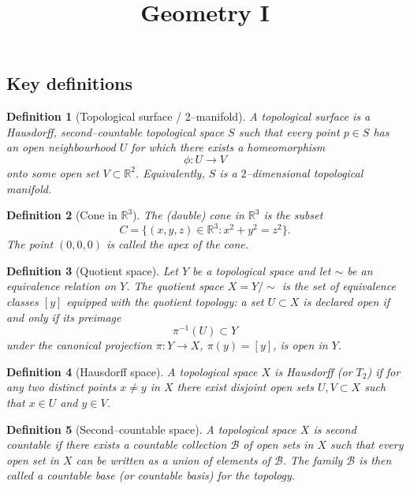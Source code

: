 \documentclass[12pt,a4paper]{article}
\title{Geometry I}
\author{}
\date{}
\theoremstyle{plain}
\newtheorem{definition}{Definition}
\theoremstyle{definition}      %
\begin{document}
	\maketitle
	

\subsection*{Key definitions}

\begin{definition}[Topological surface / 2--manifold]
	A \emph{topological surface} is a Hausdorff, second--countable topological
	space $S$ such that every point $p\in S$ has an open neighbourhood $U$
	for which there exists a homeomorphism
	\[
	\phi:U \longrightarrow V
	\]
	onto some open set $V\subset\mathbb{R}^2$.
	Equivalently, $S$ is a $2$--dimensional topological manifold.
\end{definition}

\begin{definition}[Cone in $\mathbb{R}^3$]
	The (double) cone in $\mathbb{R}^3$ is the subset
	\[
	C = \{(x,y,z)\in\mathbb{R}^3 : x^2 + y^2 = z^2\}.
	\]
	The point $(0,0,0)$ is called the \emph{apex} of the cone.
\end{definition}

\begin{definition}[Quotient space]
	Let $Y$ be a topological space and let $\sim$ be an equivalence relation
	on $Y$.  The \emph{quotient space} $X = Y/{\sim}$ is the set of
	equivalence classes $[y]$ equipped with the \emph{quotient topology}:
	a set $U\subset X$ is declared open if and only if its preimage
	\[
	\pi^{-1}(U) \subset Y
	\]
	under the canonical projection $\pi:Y\to X$, $\pi(y)=[y]$, is open in $Y$.
\end{definition}

\begin{definition}[Hausdorff space]
	A topological space $X$ is \emph{Hausdorff} (or $T_2$) if for any two
	distinct points $x\neq y$ in $X$ there exist disjoint open sets
	$U,V\subset X$ such that $x\in U$ and $y\in V$.
\end{definition}

\begin{definition}[Second--countable space]
	A topological space $X$ is \emph{second countable} if there exists a
	countable collection $\mathcal{B}$ of open sets in $X$ such that every
	open set in $X$ can be written as a union of elements of $\mathcal{B}$.
	The family $\mathcal{B}$ is then called a \emph{countable base} (or
	\emph{countable basis}) for the topology.
\end{definition}
\end{document}
